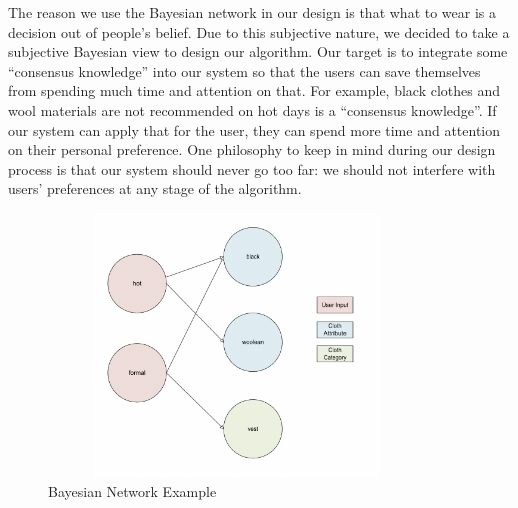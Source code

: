 The reason we use the Bayesian network in our design is that what to wear is a decision out of people's belief. Due to this subjective nature, we decided to take a subjective Bayesian view\cite{russell2010artificial} to design our algorithm. Our target is to integrate some “consensus knowledge” into our system so that the users can save themselves from spending much time and attention on that. For example, black clothes and wool materials are not recommended on hot days is a “consensus knowledge”. If our system can apply that for the user, they can spend more time and attention on their personal preference. One philosophy to keep in mind during our design process is that our system should never go too far: we should not interfere with users' preferences at any stage of the algorithm.
\begin{figure}[h]
   \centering
   \includegraphics[width=10cm,height=7cm]{graph/BayNet.png}
   \caption{Bayesian Network Example}
   \label{BayesianNetworkExample}
   \end{figure}
   
